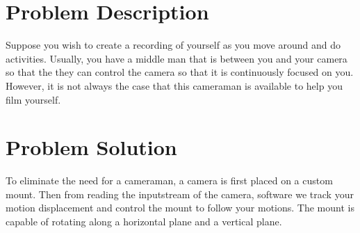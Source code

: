 \documentclass[12pt]{article}
\begin{document}
\maketitle

\section{Problem Description}
Suppose you wish to create a recording of yourself as you move around and do activities. Usually, you have a middle man that is between you and your camera so that the they can control the camera so that it is continuously focused on you. However, it is not always the case that this cameraman is available to help you film yourself.

\section{Problem Solution}
To eliminate the need for a cameraman, a camera is first placed on a custom mount. Then from reading the inputstream of the camera, software we track your motion displacement and control the mount to follow your motions. The mount is capable of rotating along a horizontal plane and a vertical plane.
\end{document}
